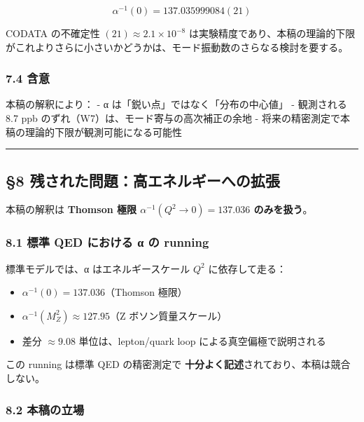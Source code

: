 \documentclass[
  11pt]{ltjsarticle}
\providecommand{\tightlist}{%
  \setlength{\itemsep}{0pt}\setlength{\parskip}{0pt}}
\begin{document}
\[\alpha^{-1}(0) = 137.035999084(21)\]

CODATA の不確定性 \((21) \approx 2.1 \times 10^{-8}\)
は実験精度であり、本稿の理論的下限がこれよりさらに小さいかどうかは、モード振動数のさらなる検討を要する。

\subsubsection{7.4 含意}\label{ux542bux610f-1}

本稿の解釈により： - α は「鋭い点」ではなく「分布の中心値」 - 観測される
8.7 ppb のずれ（W7）は、モード寄与の高次補正の余地 -
将来の精密測定で本稿の理論的下限が観測可能になる可能性

\begin{center}\rule{0.5\linewidth}{0.5pt}\end{center}

\subsection{§8
残された問題：高エネルギーへの拡張}\label{ux6b8bux3055ux308cux305fux554fux984cux9ad8ux30a8ux30cdux30ebux30aeux30fcux3078ux306eux62e1ux5f35}

本稿の解釈は \textbf{Thomson 極限 \(\alpha^{-1}(Q^2 \to 0) = 137.036\)
のみを扱う}。

\subsubsection{8.1 標準 QED における α の
running}\label{ux6a19ux6e96-qed-ux306bux304aux3051ux308b-ux3b1-ux306e-running}

標準モデルでは、α はエネルギースケール \(Q^2\) に依存して走る：

\begin{itemize}
\tightlist
\item
  \(\alpha^{-1}(0) = 137.036\)（Thomson 極限）
\item
  \(\alpha^{-1}(M_Z^2) \approx 127.95\)（Z ボソン質量スケール）
\item
  差分 \(\approx 9.08\) 単位は、lepton/quark loop
  による真空偏極で説明される
\end{itemize}

この running は標準 QED の精密測定で
\textbf{十分よく記述}されており、本稿は競合しない。

\subsubsection{8.2 本稿の立場}\label{ux672cux7a3fux306eux7acbux5834}
\end{document}
